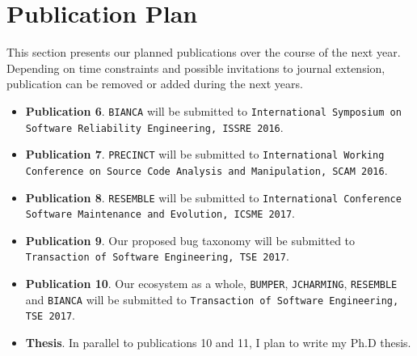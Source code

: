 \section{Publication Plan\label{sec:publication-plan}}

This section presents our planned publications over the course of the next year.
Depending on time constraints and possible invitations to journal extension, publication can be removed or added during the next years.

\begin{itemize}

	\item {\bf Publication 6}. {\tt BIANCA} will be submitted to {\tt International Symposium on Software Reliability Engineering, ISSRE 2016}.
	\item {\bf Publication 7}. {\tt PRECINCT} will be submitted to {\tt International Working Conference on Source Code Analysis and Manipulation, SCAM 2016}.
	\item {\bf Publication 8}. {\tt RESEMBLE} will be submitted to {\tt International Conference Software Maintenance and Evolution, ICSME 2017}.
	\item {\bf Publication 9}. Our proposed bug taxonomy will be submitted to {\tt Transaction of Software Engineering, TSE 2017}.
	\item {\bf Publication 10}. Our ecosystem as a whole, {\tt BUMPER}, {\tt JCHARMING}, {\tt RESEMBLE} and {\tt BIANCA} will be submitted to {\tt Transaction of Software Engineering, TSE 2017}.
	\item {\bf Thesis}. In parallel to publications 10 and 11, I plan to write my Ph.D thesis.
\end{itemize}
